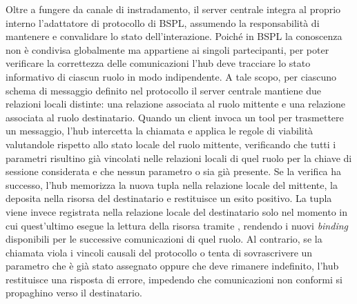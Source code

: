Oltre a fungere da canale di instradamento, il server centrale integra al proprio interno l'adattatore di protocollo di BSPL, assumendo la responsabilità di mantenere e convalidare lo stato dell'interazione. Poiché in BSPL la conoscenza non è condivisa globalmente ma appartiene ai singoli partecipanti, per poter verificare la correttezza delle comunicazioni l'hub deve tracciare lo stato informativo di ciascun ruolo in modo indipendente. 
A tale scopo, per ciascuno schema di messaggio definito nel protocollo il server centrale mantiene due relazioni locali distinte: una relazione associata al ruolo mittente e una relazione associata al ruolo destinatario. Quando un client invoca un tool per trasmettere un messaggio, l'hub intercetta la chiamata e applica le regole di viabilità valutandole rispetto allo stato locale del ruolo mittente, verificando che tutti i parametri  risultino già vincolati nelle relazioni locali di quel ruolo per la chiave di sessione considerata e che nessun parametro  o  sia già presente. Se la verifica ha successo, l'hub memorizza la nuova tupla nella relazione locale del mittente, la deposita nella risorsa del destinatario e restituisce un esito positivo. La tupla viene invece registrata nella relazione locale del destinatario solo nel momento in cui quest'ultimo esegue la lettura della risorsa tramite , rendendo i nuovi \emph{binding} disponibili per le successive comunicazioni di quel ruolo.
Al contrario, se la chiamata viola i vincoli causali del protocollo o tenta di sovrascrivere un parametro che è già stato assegnato oppure che deve rimanere indefinito, l'hub restituisce una risposta di errore, impedendo che comunicazioni non conformi si propaghino verso il destinatario.

